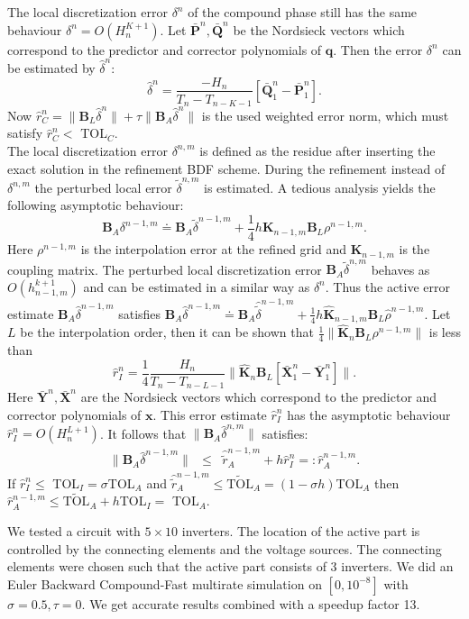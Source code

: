 \documentclass{report}
\begin{document}
The local
discretization error $\delta^n$ of the compound phase still
has the same behaviour $\delta^n = O(H_n^{K+1})$. Let
$\bar{\mathbf{P}}^n,\bar{\mathbf{Q}}^n$ be the Nordsieck
vectors which correspond to the predictor and corrector
polynomials of $\mathbf{q}$. Then the error $\delta^n$ can
be estimated by $\hat{\delta}^n$:
$$
\hat{\delta}^n = \frac{-H_n}{T_n - T_{n-K-1}} \left
[\bar{\mathbf{Q}}_{1}^{n}-\bar{\mathbf{P}}_{1}^{n} \right ].
$$
Now $\hat r_C^n = \|\mathbf{B}_L
\hat{\delta}^n\| + \tau\|\mathbf{B}_A \hat{\delta}^n\| $ is
the used weighted error norm, which must satisfy $\hat r_C^n
<$ TOL$_C$.\\ The local discretization error $\delta^{n,m}$
is defined as the residue after inserting the exact solution
in the refinement BDF scheme. During the refinement instead
of $\delta^{n,m}$ the perturbed local error
$\tilde{\delta}^{n,m}$ is estimated. A tedious analysis
yields the following asymptotic behaviour:
$$
\mathbf{B}_A\delta^{n-1,m} \doteq
\mathbf{B}_A\tilde{\delta}^{n-1,m} + \frac{1}{4}h
\mathbf{K}_{n-1,m}\mathbf{B}_L\rho^{n-1,m}.
$$
Here $\rho^{n-1,m}$ is the interpolation error at the 
refined grid and $\mathbf{K}_{n-1,m}$ is the coupling
matrix. The perturbed local discretization error
$\mathbf{B}_A\tilde{\delta}^{n,m}$ behaves as
$O(h_{n-1,m}^{k+1})$ and can be estimated in a similar way
as $\delta^n$. Thus the active error estimate
$\mathbf{B}_A\hat\delta^{n-1,m}$ satisfies
$\mathbf{B}_A\hat\delta^{n-1,m} \doteq 
\mathbf{B}_A\hat{\tilde{\delta}}^{n-1,m} + \frac{1}{4}h
\hat{\mathbf{K}}_{n-1,m}\mathbf{B}_L\hat\rho^{n-1,m}$. Let
$L$ be the interpolation order, then it can be shown that
$\frac{1}{4}\|\hat{\mathbf{K}}_{n}\mathbf{B}_L\rho^{n-1,m}\|$
is less than
$$
\hat{r}_I^{n} =
\frac{1}{4}\frac{H_n}{T_n - T_{n-L-1}}
\|\hat{\mathbf{K}}_{n}\mathbf{B}_L
\left[\bar{\mathbf{X}}_{1}^n
-\bar{\mathbf{Y}}_{1}^n\right] \|.
$$
Here
$\bar{\mathbf{Y}}^n,\bar{\mathbf{X}}^n$ are the Nordsieck
vectors which correspond to the predictor and corrector
polynomials of $\mathbf{x}$. This error estimate
$\hat{r}_I^n$ has the asymptotic behaviour $\hat{r}_I^{n} =
O(H_n^{L+1})$. It follows that
$\|\mathbf{B}_A\hat{\delta}^{n,m}\|$ satisfies:
$$
\begin{array}{rcl}
\|\mathbf{B}_A\hat{\delta}^{n-1,m}\| &\leq&
\hat{\tilde{r}}_A^{n-1,m} + h\hat{r}_I^{n} =:
\hat{r}_A^{n-1,m}. \end{array}
$$
If $\hat{r}_I^{n} \leq $ TOL$_I = \sigma$TOL$_A$ and
$\hat{\tilde{r}}_A^{n-1,m} \leq \tilde{\mbox{TOL}}_A =
(1-\sigma h)$TOL$_A$ then $\hat{r}_A^{n-1,m} \leq
\tilde{\mbox{TOL}}_A + h$TOL$_I =$ TOL$_A$.

We tested a
circuit with $5 \times 10$ inverters. The location of the
active part is controlled by the connecting elements and the
voltage sources. The connecting elements were chosen such
that the active part consists of 3 inverters. We did an
Euler Backward Compound-Fast multirate simulation on
$[0,10^{-8}]$ with $\sigma = 0.5,\tau = 0$. We get accurate
results combined with a speedup factor 13. 



\end{document}
